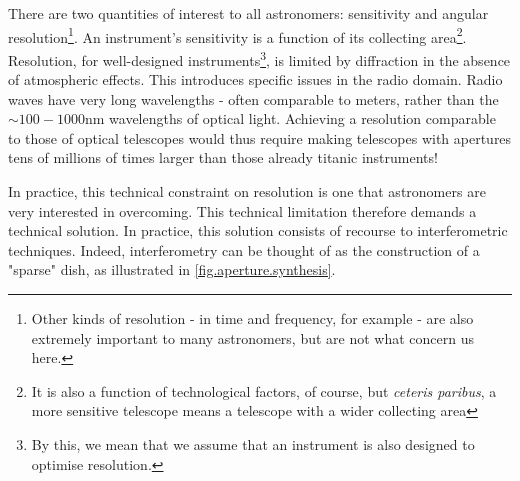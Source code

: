 \pg
There are two quantities of interest to all astronomers: sensitivity and angular resolution\footnote{Other kinds of resolution - in time and frequency, for example - are also extremely important to many astronomers, but are not what concern us here.}. An instrument's sensitivity is a function of its collecting area\footnote{It is also a function of technological factors, of course, but \emph{ceteris paribus}, a more sensitive telescope means a telescope with a wider collecting area}. Resolution, for well-designed instruments\footnote{By this, we mean that we assume that an instrument is also designed to optimise resolution.}, is limited by diffraction in the absence of atmospheric effects. This introduces specific issues in the radio domain. Radio waves have very long wavelengths - often comparable to meters, rather than the $\sim100-1000$nm wavelengths of optical light. Achieving a resolution comparable to those of optical telescopes would thus require making telescopes with apertures tens of millions of times larger than those already titanic instruments!

\pg
In practice, this technical constraint on resolution is one that astronomers are very interested in overcoming. This technical limitation therefore demands a technical solution. In practice, this solution consists of recourse to interferometric techniques. Indeed, interferometry can be thought of as the construction of a "sparse" dish, as illustrated in \cref{fig.aperture.synthesis}.

